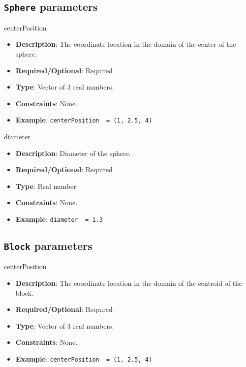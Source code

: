 \subsection*{ \lstinline!Sphere! parameters }

centerPosition
\vspace{\the\parameterListSpacing}
\begin{itemize}
    \item {\bf Description}: The coordinate location in the domain of the center of the sphere.
    \item {\bf Required/Optional}: Required
    \item {\bf Type}: Vector of 3 real numbers.
    \item {\bf Constraints}: None. 
    \item {\bf Example}: \lstinline!centerPosition  = (1, 2.5, 4)!
\end{itemize}

diameter
\vspace{\the\parameterListSpacing}
\begin{itemize}
    \item {\bf Description}: Diameter of the sphere.
    \item {\bf Required/Optional}: Required
    \item {\bf Type}: Real number
    \item {\bf Constraints}: None.
    \item {\bf Example}: \lstinline!diameter  = 1.3!
\end{itemize}


\subsection*{\lstinline!Block! parameters }

centerPosition
\vspace{\the\parameterListSpacing}
\begin{itemize}
    \item {\bf Description}: The coordinate location in the domain of the centroid of the block.
    \item {\bf Required/Optional}: Required
    \item {\bf Type}: Vector of 3 real numbers.
    \item {\bf Constraints}: None. 
    \item {\bf Example}: \lstinline!centerPosition  = (1, 2.5, 4)!
\end{itemize}

